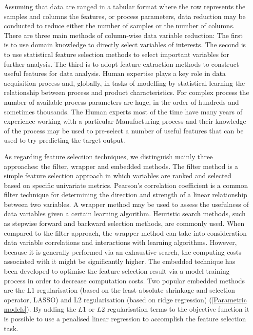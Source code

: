 
Assuming that data are ranged in a tabular format where the row represents the samples and columns the features, or process parameters, data reduction may be conducted to reduce either the number of samples or the number of columns.
There are three main methods of column-wise data variable reduction: The first is to use domain knowledge to directly select variables of interests. The second is to use statistical feature selection methods to select important variables for further analysis. The third is to adopt feature extraction methods to construct useful features for data analysis.
Human expertise plays a key role in data acquisition process and, globally, in tasks of modelling by statistical learning the relationship between process and product characteristics. For complex process the number of available process parameters are huge, in the order of hundreds and sometimes thousands. The Human experts most of the time have many years of experience working with a particular Manufacturing process and their knowledge of the process may be used to pre-select a number of useful features that can be used to try predicting the target output. 

As regarding feature selection techniques, we distinguish mainly three approaches: the filter, wrapper and embedded methods. The filter method is a simple feature selection approach in which variables are ranked and selected based on specific univariate metrics. Pearson's correlation coefficient is a common filter technique for determining the direction and strength of a linear relationship between two variables. A wrapper method may be used to assess the usefulness of data variables given a certain learning algorithm. Heuristic search methods, such as stepwise forward and backward selection methods, are commonly used. When compared to the filter approach, the wrapper method can take into consideration data variable correlations and interactions with learning algorithms. However, because it is generally performed via an exhaustive search, the computing costs associated with it might be significantly higher. The embedded technique has been developed to optimise the feature selection result via a model training process in order to decrease computation costs. Two popular embedded methods are the L1 regularisation (based on the least absolute shrinkage and selection operator, LASSO) and L2 regularisation (based on ridge regression) (\ref{Parametric models}). By adding the $L1$ or $L2$ regularisation terms to the objective function it is possible to use a penalised linear regression to accomplish the feature selection task.

